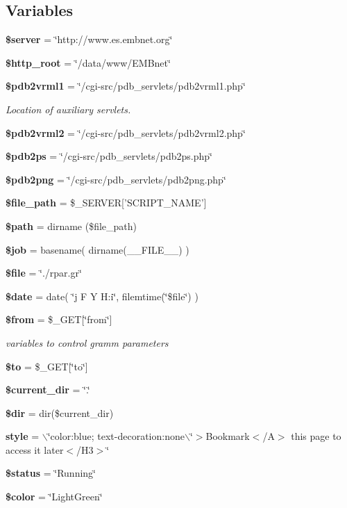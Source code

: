 \subsection*{Variables}
\begin{CompactItemize}
\item 
{\bf \$server} = \char`\"{}http://www.es.embnet.org\char`\"{}
\item 
{\bf \$http\_\-root} = \char`\"{}/data/www/EMBnet\char`\"{}
\item 
{\bf \$pdb2vrml1} = \char`\"{}/cgi-src/pdb\_\-servlets/pdb2vrml1.php\char`\"{}
\begin{CompactList}\small\item\em Location of auxiliary servlets. \item\end{CompactList}\item 
{\bf \$pdb2vrml2} = \char`\"{}/cgi-src/pdb\_\-servlets/pdb2vrml2.php\char`\"{}
\item 
{\bf \$pdb2ps} = \char`\"{}/cgi-src/pdb\_\-servlets/pdb2ps.php\char`\"{}
\item 
{\bf \$pdb2png} = \char`\"{}/cgi-src/pdb\_\-servlets/pdb2png.php\char`\"{}
\item 
{\bf \$file\_\-path} = \$\_\-SERVER['SCRIPT\_\-NAME']
\item 
{\bf \$path} = dirname (\$file\_\-path)
\item 
{\bf \$job} = basename( dirname(\_\-\_\-FILE\_\-\_\-) )
\item 
{\bf \$file} = \char`\"{}./rpar.gr\char`\"{}
\item 
{\bf \$date} = date( \char`\"{}j F Y H:i\char`\"{}, filemtime(\char`\"{}\$file\char`\"{}) )
\item 
{\bf \$from} = \$\_\-GET[\char`\"{}from\char`\"{}]
\begin{CompactList}\small\item\em variables to control gramm parameters \item\end{CompactList}\item 
{\bf \$to} = \$\_\-GET[\char`\"{}to\char`\"{}]
\item 
{\bf \$current\_\-dir} = \char`\"{}.\char`\"{}
\item 
{\bf \$dir} = dir(\$current\_\-dir)
\item 
{\bf style} = $\backslash$\char`\"{}color:blue; text-decoration:none$\backslash$\char`\"{}$>$Bookmark$<$/A$>$ this page to access it later$<$/H3$>$\char`\"{}
\item 
{\bf \$status} = \char`\"{}Running\char`\"{}
\item 
{\bf \$color} = \char`\"{}Light\-Green\char`\"{}
\end{CompactItemize}



